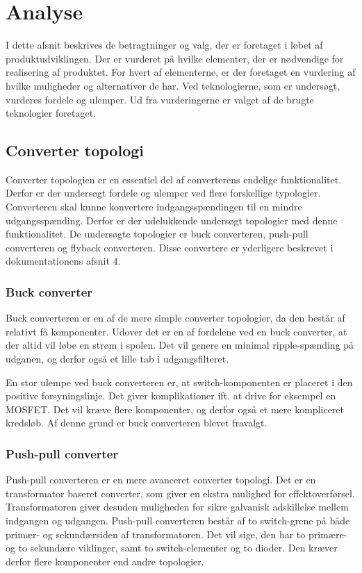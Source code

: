 
\chapter{Analyse}
I dette afsnit beskrives de betragtninger og valg, der er foretaget i løbet af produktudviklingen. Der er vurderet på hvilke elementer, der er nødvendige for realisering af produktet. For hvert af elementerne, er der foretaget en vurdering af hvilke muligheder og alternativer de har. Ved teknologierne, som er undersøgt, vurderes fordele og ulemper. Ud fra vurderingerne er valget af de brugte teknologier foretaget. 

\section{Converter topologi}
Converter topologien er en essentiel del af converterens endelige funktionalitet. Derfor er der undersøgt fordele og ulemper ved flere forskellige typologier. Converteren skal kunne konvertere indgangsspændingen til en mindre udgangsspænding. Derfor er der udelukkende undersøgt topologier med denne funktionalitet. De undersøgte topologier er buck converteren, push-pull converteren og flyback converteren. Disse convertere er yderligere beskrevet i dokumentationens afsnit 4.

\subsection{Buck converter}
Buck converteren er en af de mere simple converter topologier, da den består af relativt få komponenter. Udover det er en af fordelene ved en buck converter, at der altid vil løbe en strøm i spolen. Det vil genere en minimal ripple-spænding på udganen, og derfor også et lille tab i udgangsfilteret. 

En stor ulempe ved buck converteren er, at switch-komponenten er placeret i den positive forsyningslinje. Det giver komplikationer ift. at drive for eksempel en MOSFET. Det vil kræve flere komponenter, og derfor også et mere kompliceret kredsløb. Af denne grund er buck converteren blevet fravalgt\cite{buck-converter}.

\subsection{Push-pull converter}
Push-pull converteren er en mere avanceret converter topologi. Det er en transformator baseret converter, som giver en ekstra mulighed for effektoverførsel. Transformatoren giver desuden muligheden for sikre galvanisk adskillelse mellem indgangen og udgangen. Push-pull converteren består af to switch-grene på både primær- og sekundærsiden af transformatoren. Det vil sige, den har to primære- og to sekundære viklinger, samt to switch-elementer og to dioder. Den kræver derfor flere komponenter end andre topologier. 

